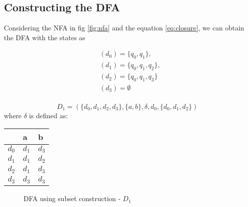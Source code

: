 \subsection*{Constructing the DFA}
Considering the NFA in fig \ref{fig:nfa} and the equation \ref{eq:closure}, we can obtain the DFA with the states as 

\begin{equation}
\begin{split}
    &(d_0) = \{q_0, q_1\},\\
    &(d_1) = \{q_0, q_1, q_2\},\\
    &(d_2) = \{q_0, q_1, q_3\}\\
    &(d_3) = \emptyset \\
\end{split}
\end{equation}

$$
D_1 = (\{d_0, d_1, d_2, d_3\}, \{a,b\}, \delta, d_0, \{d_0, d_1, d_2\})
$$
where $\delta$ is defined as:
\begin{tabular}{|l|l|l|}
\hline
    & a   & b   \\ \hline
$d_0$ & $d_1$ & $d_3$ \\
$d_1$ & $d_1$ & $d_2$ \\
$d_2$ & $d_1$ & $d_3$ \\
$d_3$ & $d_3$ & $d_3$ \\ \hline
\end{tabular}

\begin{figure}[ht]
\centering
{}
\caption{DFA using subset construction - $D_1$}
\label{fig:dfa}
\end{figure}



